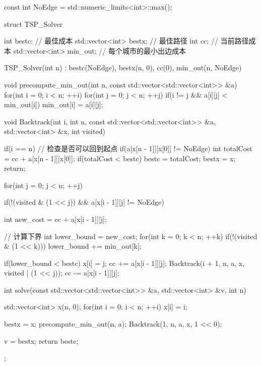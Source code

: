 \begin{cppcode}
const int NoEdge = std::numeric_limits<int>::max();

struct TSP_Solver {
    int bestc;                      // 最佳成本
    std::vector<int> bestx;         // 最佳路径
    int cc;                         // 当前路径成本
    std::vector<int> min_out;       // 每个城市的最小出边成本

    TSP_Solver(int n) : bestc(NoEdge), bestx(n, 0), cc(0), min_out(n, NoEdge) {}

    void precompute_min_out(int n, const std::vector<std::vector<int>> &a){
        for(int i = 0; i < n; ++i){
            for(int j = 0; j < n; ++j){
                if(i != j && a[i][j] < min_out[i]){
                    min_out[i] = a[i][j];
                }
            }
        }
    }

    void Backtrack(int i, int n, const std::vector<std::vector<int>> &a, std::vector<int> &x, int visited) {
        if(i == n){
            // 检查是否可以回到起点
            if(a[x[n - 1]][x[0]] != NoEdge){
                int totalCost = cc + a[x[n - 1]][x[0]];
                if(totalCost < bestc){
                    bestc = totalCost;
                    bestx = x;
                }
            }
            return;
        }

        for(int j = 0; j < n; ++j){
            if(!(visited & (1 << j)) && a[x[i - 1]][j] != NoEdge){
                int new_cost = cc + a[x[i - 1]][j];

                // 计算下界
                int lower_bound = new_cost;
                for(int k = 0; k < n; ++k){
                    if(!(visited & (1 << k))){
                        lower_bound += min_out[k];
                    }
                }

                if(lower_bound < bestc){
                    x[i] = j;
                    cc += a[x[i - 1]][j];           
                    Backtrack(i + 1, n, a, x, visited | (1 << j)); 
                    cc -= a[x[i - 1]][j];           
                }
            }
        }
    }

    int solve(const std::vector<std::vector<int>> &a, std::vector<int> &v, int n){
        std::vector<int> x(n, 0); 
        for(int i = 0; i < n; ++i){
            x[i] = i;
        }

        bestx = x;
        precompute_min_out(n, a); 
        Backtrack(1, n, a, x, 1 << 0);

        v = bestx; 
        return bestc;
    }
};
\end{cppcode}

